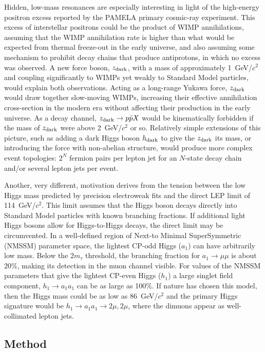 \documentclass[12pt]{cms-tdr}
\newcommand{\s}[1]{{\mbox{\scriptsize #1}}}
\begin{document}
Hidden, low-mass resonances are especially interesting in light of the
high-energy positron excess reported by the PAMELA primary cosmic-ray
experiment.  This excess of interstellar positrons could be the
product of WIMP annihilations, assuming that the WIMP annihilation
rate is higher than what would be expected from thermal freeze-out in
the early universe, and also assuming some mechanism to prohibit decay
chains that produce antiprotons, in which no excess was observed.  A
new force boson, $z_\s{dark}$, with a mass of approximately
1~GeV/$c^2$ and coupling significantly to WIMPs yet weakly to Standard
Model particles, would explain both observations.  Acting as a
long-range Yukawa force, $z_\s{dark}$ would draw together slow-moving
WIMPs, increasing their effective annihilation cross-section in the
modern era without affecting their production in the early universe.
As a decay channel, $z_\s{dark} \to p\bar{p} X$ would be
kinematically forbidden if the mass of $z_\s{dark}$ were above
2~GeV/$c^2$ or so.  Relatively simple extensions of this picture, such
as adding a dark Higgs boson $h_\s{dark}$ to give the $z_\s{dark}$ its
mass, or introducing the force with non-abelian structure, would
produce more complex event topologies: $2^N$ fermion pairs per lepton
jet for an $N$-state decay chain and/or several lepton jets per event.

Another, very different, motivation derives from the tension between
the low Higgs mass predicted by precision electroweak fits and the
direct LEP limit of 114~GeV/$c^2$.  This limit assumes that the Higgs
boson decays directly into Standard Model particles with known
branching fractions.  If additional light Higgs bosons allow for
Higgs-to-Higgs decays, the direct limit may be circumvented.  In a
well-defined region of Next-to Minimal SuperSymmetric (NMSSM)
parameter space, the lightest CP-odd Higgs ($a_1$) can have
arbitrarily low mass.  Below the $2m_\tau$ threshold, the branching
fraction for $a_1 \to \mu\mu$ is about 20\%, making its detection in
the muon channel visible.  For values of the NMSSM parameters that
give the lightest CP-even Higgs ($h_1$) a large singlet field
component, $h_1 \to a_1 a_1$ can be as large as 100\%.  If nature has
chosen this model, then the Higgs mass could be as low as 86~GeV/$c^2$
and the primary Higgs signature would be $h_1 \to a_1 a_1 \to 2\mu,
2\mu$, where the dimuons appear as well-collimated lepton jets.

\subsection{Method}
\end{document}
